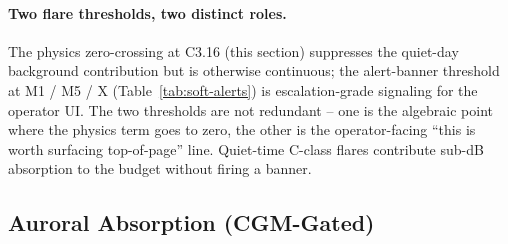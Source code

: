 \documentclass[11pt,a4paper]{article}
\begin{document}
\paragraph{Two flare thresholds, two distinct roles.}  The
physics zero-crossing at C3.16 (this section) suppresses the
quiet-day background contribution but is otherwise continuous;
the alert-banner threshold at M1 / M5 / X
(Table~\ref{tab:soft-alerts}) is escalation-grade signaling for
the operator UI.  The two thresholds are not redundant -- one is
the algebraic point where the physics term goes to zero, the
other is the operator-facing ``this is worth surfacing
top-of-page'' line.  Quiet-time C-class flares contribute
sub-dB absorption to the budget without firing a banner.

\subsection{Auroral Absorption (CGM-Gated)}\label{sec:laur}
\end{document}
